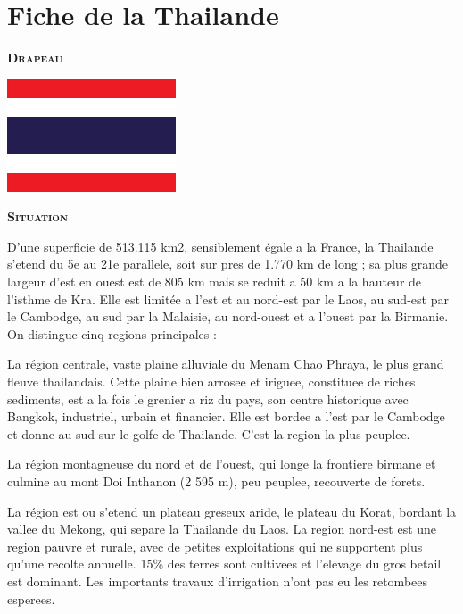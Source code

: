 \section{Fiche de la Thailande}

\begin{multicols}{2}

\textbf{\textsc{Drapeau}}

\smallbreak
\hspace*{-0.65cm}
\includegraphics[width=5cm]{articles/Fiche-de-la-thailande/drapeau_thailande.png}
\smallbreak

\textbf{\textsc{Situation}}

D’une superficie de 513.115 km2, sensiblement égale a la France, la Thailande s’etend du 5e au 21e parallele, soit sur pres de 1.770 km de long ; sa plus grande largeur d’est en ouest est de 805 km mais se reduit a 50 km a la hauteur de l’isthme de Kra.
Elle est limitée a l’est et au nord-est par le Laos, au sud-est par le Cambodge, au sud par la Malaisie, au nord-ouest et a l’ouest par la Birmanie. On distingue cinq regions principales :

La région centrale, vaste plaine alluviale du Menam Chao Phraya, le plus grand fleuve thailandais. Cette plaine bien arrosee et iriguee, constituee de riches sediments, est a la fois le grenier a riz du pays, son centre historique avec Bangkok, industriel, urbain et financier. Elle est bordee a l’est par le Cambodge et donne au sud sur le golfe de Thailande. C’est la region la plus peuplee.

La région montagneuse du nord et de l’ouest, qui longe la frontiere birmane et culmine au mont Doi Inthanon (2 595 m), peu peuplee, recouverte de forets.

La région est ou s’etend un plateau greseux aride, le plateau du Korat, bordant la vallee du Mekong, qui separe la Thailande du Laos. La region nord-est est une region pauvre et rurale, avec de petites exploitations qui ne supportent plus qu’une recolte annuelle. 15\% des terres sont cultivees et l’elevage du gros betail est dominant. Les importants travaux d’irrigation n’ont pas eu les retombees esperees.


\end{multicols}

